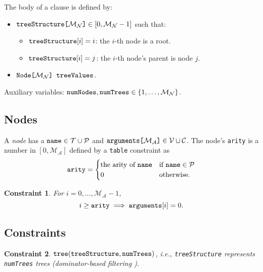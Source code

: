 \documentclass[runningheads]{llncs}
\newtheorem{constraint}{Constraint}
\newcommand{\variable}[1]{\texttt{\textup{#1}}}
\newcommand{\arrayd}[3]{\variable{{#1}[}{#2}\variable{]} \in {#3}}
\newcommand{\arrayt}[3]{\variable{{#3}[}{#2}\variable{] {#1}}}
\newcommand{\predicates}{\mathcal{P}}
\newcommand{\variables}{\mathcal{V}}
\newcommand{\constants}{\mathcal{C}}
\newcommand{\tokens}{\mathcal{T}}
\newcommand{\maxArity}{\mathcal{M}_{\mathcal{A}}}
\newcommand{\maxNumNodes}{\mathcal{M}_{\mathcal{N}}}
\begin{document}
\begin{definition}
  The body of a clause is defined by:
  \begin{itemize}
  \item $\arrayd{treeStructure}{\maxNumNodes{}}{[0, \maxNumNodes{} - 1]}$ such
    that:
    \begin{itemize}
    \item $\variable{treeStructure}[i] = i$: the $i$-th node is a root.
    \item $\variable{treeStructure}[i] = j$: the $i$-th node's parent is node $j$.
    \end{itemize}
  \item $\arrayt{treeValues}{\maxNumNodes{}}{Node}$.
  \end{itemize}
\end{definition}

Auxiliary variables: $\variable{numNodes}, \variable{numTrees} \in \{ 1, \dots,
\maxNumNodes{} \}$.

\subsection{Nodes}

\begin{definition} \label{def:node}
  A \emph{node} has a $\variable{name} \in \tokens{} \cup \predicates{}$ and
  $\arrayd{arguments}{\maxArity{}}{\variables{} \cup \constants{}}$. The node's
  \variable{arity} is a number in $[0, \maxArity{}]$ defined by a
  \variable{table} constraint as
  \[
    \variable{arity} = \begin{cases}
      \text{the arity of } \variable{name} & \text{if } \variable{name} \in
      \predicates{}\\
      0 & \text{otherwise.}
    \end{cases}
  \]
\end{definition}

\begin{constraint}
  For $i = 0, \dots, \maxArity{} - 1$,
  \[
    i \ge \variable{arity} \implies \variable{arguments}[i] = 0.
  \]
\end{constraint}

\subsection{Constraints}

\begin{constraint}
  $\variable{tree}(\variable{treeStructure}, \variable{numTrees})$, i.e.,
  \variable{treeStructure} represents \variable{numTrees} trees (dominator-based
  filtering \cite{DBLP:conf/cp/FagesL11}).
\end{constraint}
\end{document}
